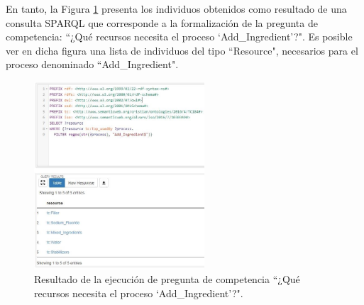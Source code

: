 \documentclass[journal]{IEEEtran}
\begin{document}
En tanto, la Figura \ref{fig13} presenta los individuos obtenidos como resultado de una consulta SPARQL que corresponde a la formalizaci\'on de la pregunta de competencia: ``¿Qu\'e recursos necesita el proceso ‘Add\_Ingredient’?". Es posible ver en dicha figura una lista de individuos del tipo ``Resource", necesarios para el proceso denominado ``Add\_Ingredient".

\begin{figure}[!t]
\centering
\includegraphics[width=2.5in]{figures/figure13.jpg}
\caption{Resultado de la ejecuci\'on de pregunta de competencia ``¿Qu\'e recursos necesita el proceso ‘Add\_Ingredient’?".}
\label{fig13}
\end{figure}



%
%

\end{document}

